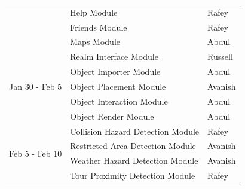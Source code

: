 \documentclass[12pt, titlepage]{article}
\begin{document}
\begin{table}[H]
\begin{tabular}{lll}
\multicolumn{1}{|l|}{}                                 & \multicolumn{1}{l|}{Help Module}                              & \multicolumn{1}{l|}{Rafey}                    \\ \cline{2-3} 
\multicolumn{1}{|l|}{}                                 & \multicolumn{1}{l|}{Friends Module}                           & \multicolumn{1}{l|}{Rafey}                    \\ \cline{2-3} 
\multicolumn{1}{|l|}{}                                 & \multicolumn{1}{l|}{Maps Module}                              & \multicolumn{1}{l|}{Abdul}                    \\ \hline
\multicolumn{1}{|l|}{\multirow{5}{*}{Jan 30 - Feb 5}}  & \multicolumn{1}{l|}{Realm Interface Module}                   & \multicolumn{1}{l|}{Russell}                  \\ \cline{2-3} 
\multicolumn{1}{|l|}{}                                 & \multicolumn{1}{l|}{Object Importer Module}                   & \multicolumn{1}{l|}{Abdul}                    \\ \cline{2-3} 
\multicolumn{1}{|l|}{}                                 & \multicolumn{1}{l|}{Object Placement Module}                  & \multicolumn{1}{l|}{Avanish}                  \\ \cline{2-3} 
\multicolumn{1}{|l|}{}                                 & \multicolumn{1}{l|}{Object Interaction Module}                & \multicolumn{1}{l|}{Abdul}                    \\ \cline{2-3} 
\multicolumn{1}{|l|}{}                                 & \multicolumn{1}{l|}{Object Render Module}                     & \multicolumn{1}{l|}{Abdul}                    \\ \hline
\multicolumn{1}{|l|}{\multirow{4}{*}{Feb 5 - Feb 10}}  & \multicolumn{1}{l|}{Collision Hazard Detection Module}         & \multicolumn{1}{l|}{Rafey}                    \\ \cline{2-3} 
\multicolumn{1}{|l|}{}                                 & \multicolumn{1}{l|}{Restricted Area Detection Module}          & \multicolumn{1}{l|}{Avanish}                  \\ \cline{2-3} 
\multicolumn{1}{|l|}{}                                 & \multicolumn{1}{l|}{Weather Hazard Detection Module}           & \multicolumn{1}{l|}{Avanish}                  \\ \cline{2-3} 
\multicolumn{1}{|l|}{}                                 & \multicolumn{1}{l|}{Tour Proximity Detection Module}           & \multicolumn{1}{l|}{Rafey}                    \\ \hline

\end{tabular}
\end{table}
\end{document}
